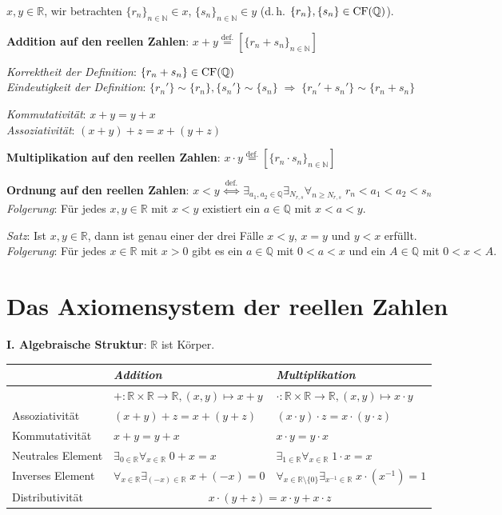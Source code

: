 $x, y \in \mathbb{R}$, wir betrachten $\{r_n\}_{n \in \mathbb{N}} \in x$,
$\{s_n\}_{n \in \mathbb{N}} \in y$ (d.\,h.
$\{r_n\}, \{s_n\} \in \operatorname{CF}(\mathbb{Q})$).

\textbf{Addition auf den reellen Zahlen}:
$x + y \overset{\text{def.}}{=} [\{r_n + s_n\}_{n \in \mathbb{N}}]$

\emph{Korrektheit der Definition}:
$\{r_n + s_n\} \in \operatorname{CF}(\mathbb{Q})$ \\
\emph{Eindeutigkeit der Definition}:
$\{r_n'\} \sim \{r_n\}, \{s_n'\} \sim \{s_n\} \;\Rightarrow\;
\{r_n' + s_n'\} \sim \{r_n + s_n\}$

\emph{Kommutativität}: $x + y = y + x$ \\
\emph{Assoziativität}: $(x + y) + z = x + (y + z)$

\textbf{Multiplikation auf den reellen Zahlen}:
$x \cdot y \overset{\text{def.}}{=} [\{r_n \cdot s_n\}_{n \in \mathbb{N}}]$

\textbf{Ordnung auf den reellen Zahlen}:
$x < y \overset{\text{def.}}{\;\Leftrightarrow\;}
\exists_{a_1, a_2 \in \mathbb{Q}} \exists_{N_{r,s}}
\forall_{n \ge N_{r,s}}\; r_n < a_1 < a_2 < s_n$ \\
\emph{Folgerung}: Für jedes $x, y \in \mathbb{R}$ mit $x < y$ existiert ein
$a \in \mathbb{Q}$ mit $x < a < y$.

\emph{Satz}: Ist $x, y \in \mathbb{R}$, dann ist genau einer der drei Fälle
$x < y$, $x = y$ und $y < x$ erfüllt. \\
\emph{Folgerung}: Für jedes $x \in \mathbb{R}$ mit $x > 0$ gibt es ein
$a \in \mathbb{Q}$ mit $0 < a < x$ und ein $A \in \mathbb{Q}$ mit $0 < x < A$.

\section{%
    Das Axiomensystem der reellen Zahlen%
}

\textbf{I. Algebraische Struktur}: $\mathbb{R}$ ist Körper.

\begin{tabular}{l|l|l}
    & \emph{Addition} & \emph{Multiplikation} \\ \hline
    & $\boldsymbol{+}: \mathbb{R} \times \mathbb{R} \rightarrow \mathbb{R},
    (x, y) \mapsto x + y$ &
    $\boldsymbol{\cdot}: \mathbb{R} \times \mathbb{R} \rightarrow \mathbb{R},
    (x, y) \mapsto x \cdot y$ \\
    Assoziativität & $(x + y) + z = x + (y + z)$ &
    $(x \cdot y) \cdot z = x \cdot (y \cdot z)$ \\
    Kommutativität & $x + y = y + x$ & $x \cdot y = y \cdot x$ \\
    Neutrales Element &
    $\exists_{0 \in \mathbb{R}} \forall_{x \in \mathbb{R}}\; 0 + x = x$ &
    $\exists_{1 \in \mathbb{R}} \forall_{x \in \mathbb{R}}\; 1 \cdot x = x$ \\
    Inverses Element &
    $\forall_{x \in \mathbb{R}} \exists_{(-x) \in \mathbb{R}}\; x + (-x) = 0$ &
    $\forall_{x \in \mathbb{R} \setminus \{0\}}
    \exists_{x^{-1} \in \mathbb{R}}\; x \cdot (x^{-1}) = 1$ \\
    Distributivität &
    \multicolumn{2}{c}{$x \cdot (y + z) = x \cdot y + x \cdot z$}
\end{tabular}

